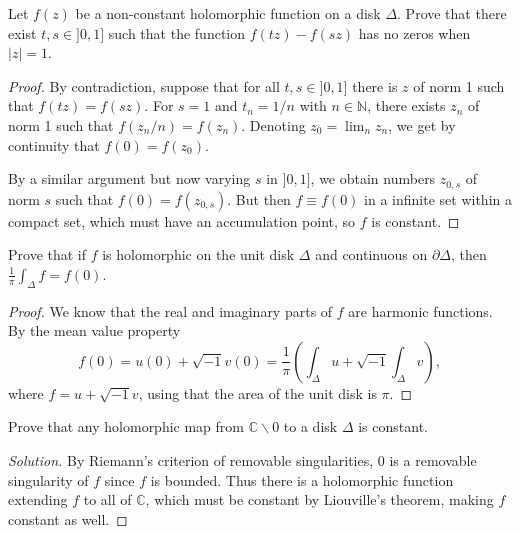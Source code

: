 \documentclass{article}
\numberwithin{equation}{section}
\newcommand{\N}{\mathbb{N}}
\newcommand{\C}{\mathbb{C}}
\begin{document}
\begin{exercise}
	Let $f(z)$ be a non-constant holomorphic function on a disk $\Delta$. Prove that there exist $t, s \in]0, 1]$ such that the function $f (tz) - f (sz)$ has no zeros when $|z| = 1$.
\end{exercise}
\begin{proof}

	
	
	 By contradiction, suppose that for all $t,s\in]0,1]$ there is $z$ of norm 1 such that $f(tz)=f(sz)$. For $s=1$ and $t_n=1/n$ with $n\in \N$, there exists $z_n$ of norm 1 such that $f(z_n/n)=f(z_n)$. Denoting $z_0=\lim_nz_n$, we get by continuity that $f(0)=f(z_0)$.
	 
	 By a similar argument but now varying $s$ in $]0,1]$, we obtain numbers $z_{0,s}$ of norm $s$ such that $f(0)=f(z_{0,s})$. But then $f\equiv f(0)$ in a infinite set within a compact set, which must have an accumulation point, so $f$ is constant.
	 
	 
\end{proof}

\begin{exercise}
	Prove that if $f$ is holomorphic on the unit disk $\Delta$ and continuous on $\partial\Delta$, then $\frac{1}{\pi}\int_\Delta f=f(0)$.
\end{exercise}
\begin{proof}
	We know that the real and imaginary parts of $f$ are harmonic functions. By the mean value property
	\[f(0)=u(0)+\sqrt{-1}v(0)=\frac{1}{\pi}\left(\int_\Delta u+\sqrt{-1}\int_\Delta v\right),\]
	where $f=u+\sqrt{-1}v$, using that the area of the unit disk is $\pi$.
\end{proof}

\begin{exercise}
	Prove that any holomorphic map from $\C\backslash0$ to a disk $\Delta$ is constant.
\end{exercise}
\begin{proof}[Solution]
	By Riemann's criterion of removable singularities, $0$ is a removable singularity of $f$ since $f$ is bounded. Thus there is a holomorphic function extending $f$ to all of $\C$, which must be constant by Liouville's theorem, making $f$ constant as well.
\end{proof}
\end{document}
